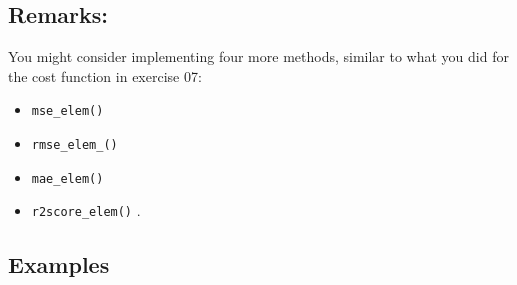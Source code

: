 \documentclass[]{article}
\begin{document}
\hypertarget{remarks}{%
\subsection{Remarks:}\label{remarks}}

You might consider implementing four more methods, similar to what you
did for the cost function in exercise 07:

\begin{itemize}
\item
  \texttt{mse\_elem()}
\item
  \texttt{rmse\_elem\_()}
\item
  \texttt{mae\_elem()}
\item
  \texttt{r2score\_elem()} .
\end{itemize}

\hypertarget{examples-8}{%
\subsection{Examples}\label{examples-8}}
\end{document}
